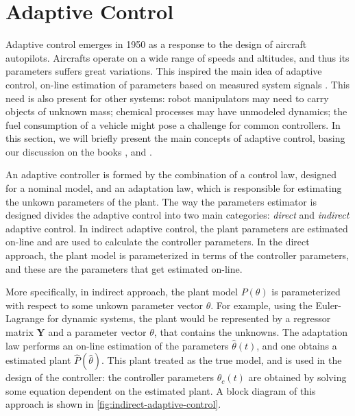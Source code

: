 \section{Adaptive Control}
Adaptive control emerges in 1950 as a response to the design of aircraft autopilots. Aircrafts operate on a wide range of speeds and altitudes, and thus its parameters suffers great variations. This inspired the main idea of adaptive control, on-line estimation of parameters based on measured system signals \citep{Slotine1991}. This need is also present for other systems: robot manipulators may need to carry objects of unknown mass; chemical processes may have unmodeled dynamics; the fuel consumption of a vehicle might pose a challenge for common controllers. In this section, we will briefly present the main concepts of adaptive control, basing our discussion on the books \citet{Slotine1991}, \citet{Krstic1995} and \citet{Ioannou2012}.

An adaptive controller is formed by the combination of a control law, designed for a nominal model, and an adaptation law, which is responsible for estimating the unkown parameters of the plant. The way the parameters estimator is designed divides the adaptive control into two main categories: \emph{direct} and \emph{indirect} adaptive control. In indirect adaptive control, the plant parameters are estimated on-line and are used to calculate the controller parameters. In the direct approach, the plant model is parameterized in terms of the controller parameters, and these are the parameters that get estimated on-line.

More specifically, in indirect approach, the plant model $P(\theta)$ is parameterized with respect to some unkown parameter vector $\theta$. For example, using the Euler-Lagrange for dynamic systems, the plant would be represented by a regressor matrix $\mathbf{Y}$ and a parameter vector $\theta$, that contains the unknowns. The adaptation law performs an on-line estimation of the parameters $\widehat{\theta}(t)$, and one obtains a estimated plant $\widehat{P}(\widehat{\theta})$. This plant treated as the true model, and is used in the design of the controller: the controller parameters $\theta_c(t)$ are obtained by solving some equation dependent on the estimated plant. A block diagram of this approach is shown in \cref{fig:indirect-adaptive-control}.

